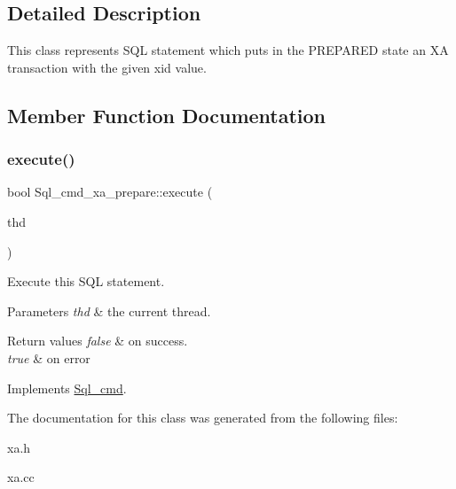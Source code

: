 \subsection{Detailed Description}
This class represents S\+QL statement which puts in the P\+R\+E\+P\+A\+R\+ED state an XA transaction with the given xid value. 

\subsection{Member Function Documentation}
\mbox{\label{classSql__cmd__xa__prepare_a238c596649cac951d4c839ae253b1624}} 
\subsubsection{\texorpdfstring{execute()}{execute()}}
{\footnotesize\ttfamily bool Sql\+\_\+cmd\+\_\+xa\+\_\+prepare\+::execute (\begin{DoxyParamCaption}\item[{T\+HD $\ast$}]{thd }\end{DoxyParamCaption})\hspace{0.3cm}{\ttfamily [virtual]}}

Execute this S\+QL statement. 
\begin{DoxyParams}{Parameters}
{\em thd} & the current thread. \\
\hline
\end{DoxyParams}

\begin{DoxyRetVals}{Return values}
{\em false} & on success. \\
\hline
{\em true} & on error \\
\hline
\end{DoxyRetVals}


Implements \mbox{\hyperlink{classSql__cmd_a213367b79b551296fbb7790f2a3732fb}{Sql\+\_\+cmd}}.



The documentation for this class was generated from the following files\+:\begin{DoxyCompactItemize}
\item 
xa.\+h\item 
xa.\+cc\end{DoxyCompactItemize}
